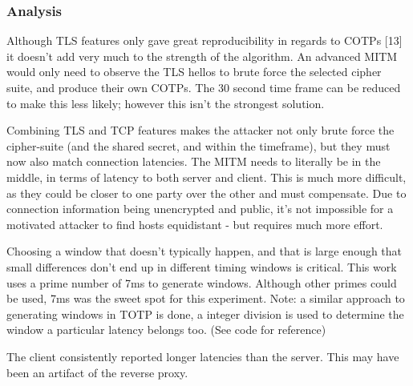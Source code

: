 \documentclass[a4paper, 11pt]{article} 				%
\begin{document}





\subsubsection{Analysis}
Although TLS features only gave great reproducibility in regards to COTPs [13] it doesn't add very much to the strength of the algorithm. An advanced MITM would only need to observe the TLS hellos to brute force the selected cipher suite, and produce their own COTPs. The 30 second time frame can be reduced to make this less likely; however this isn't the strongest solution.

Combining TLS and TCP features makes the attacker not only brute force the cipher-suite (and the shared secret, and within the timeframe), but they must now also match connection latencies. The MITM needs to literally be in the middle, in terms of latency to both server and client. This is much more difficult, as they could be closer to one party over the other and must compensate. Due to connection information being unencrypted and public, it's not impossible for a motivated attacker to find hosts equidistant - but requires much more effort.

Choosing a window that doesn't typically happen, and that is large enough that small differences don't end up in different timing windows is critical. This work uses a prime number of 7ms to generate windows. Although other primes could be used, 7ms was the sweet spot for this experiment. Note: a similar approach to generating windows in TOTP is done, a integer division is used to determine the window a particular latency belongs too. (See code for reference)

The client consistently reported longer latencies than the server. This may have been an artifact of the reverse proxy.




\end{document}
